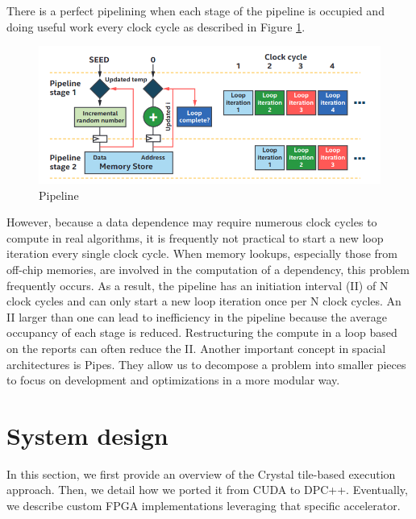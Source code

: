 \documentclass[sigconf, nonacm]{acmart}
\begin{document}
There is a perfect pipelining when each stage of the pipeline is occupied and doing useful work every clock cycle as described in Figure \ref{fig:pipeline}.

\begin{figure}[H]
  \centering
  \includegraphics[width=\linewidth]{figures/pipeline.png}
  \caption{Pipeline}
  \label{fig:pipeline}
\end{figure}

However, because a data dependence may require numerous clock cycles to compute in real algorithms, it is frequently not practical to start a new loop iteration every single clock cycle.
When memory lookups, especially those from off-chip memories, are involved in the computation of a dependency, this problem frequently occurs.
As a result, the pipeline has an initiation interval (II) of N clock cycles and can only start a new loop iteration once per N clock cycles.
An II larger than one can lead to inefficiency in the pipeline because
the average occupancy of each stage is reduced. Restructuring the compute in a loop based on the reports can often reduce the II.
Another important concept in spacial architectures is Pipes. They allow us to decompose a problem into smaller pieces to focus on
development and optimizations in a more modular way.

\section{System design}
In this section, we first provide an overview
of the Crystal tile-based execution approach. Then, we detail how we ported it from CUDA to DPC++. Eventually, we describe custom FPGA implementations leveraging that specific accelerator.  
\end{document}
